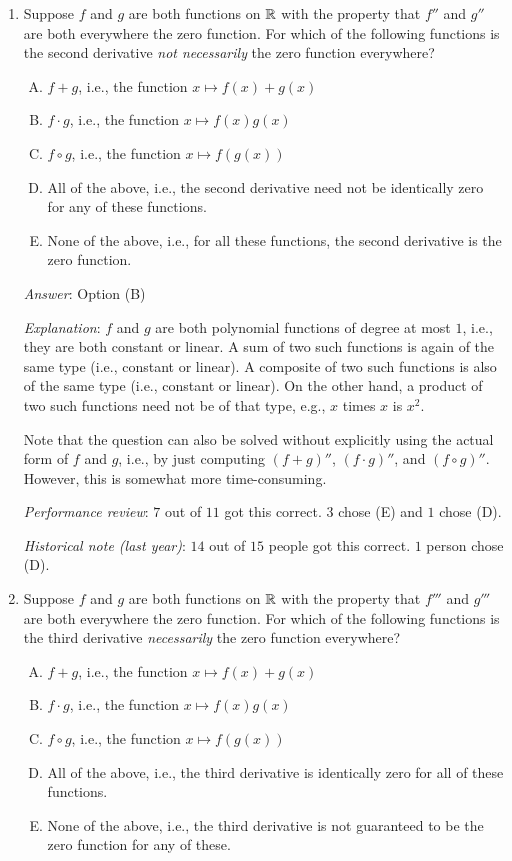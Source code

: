 \documentclass[10pt]{amsart}
\begin{document}
\begin{enumerate}

\item Suppose $f$ and $g$ are both functions on $\mathbb{R}$ with the property
  that $f''$ and $g''$ are both everywhere the zero function. For
  which of the following functions is the second derivative {\em not
  necessarily} the zero function everywhere?

  \begin{enumerate}[(A)]
  \item $f + g$, i.e., the function $x \mapsto f(x) + g(x)$
  \item $f \cdot g$, i.e., the function $x \mapsto f(x)g(x)$
  \item $f \circ g$, i.e., the function $x \mapsto f(g(x))$
  \item All of the above, i.e., the second derivative need not be
    identically zero for any of these functions.
  \item None of the above, i.e., for all these functions, the second
    derivative is the zero function.
  \end{enumerate}

  {\em Answer}: Option (B)

  {\em Explanation}: $f$ and $g$ are both polynomial functions of
  degree at most $1$, i.e., they are both constant or linear. A sum of
  two such functions is again of the same type (i.e., constant or
  linear). A composite of two such functions is also of the same type
  (i.e., constant or linear). On the other hand, a product of two such
  functions need not be of that type, e.g., $x$ times $x$ is $x^2$.

  Note that the question can also be solved without explicitly using
  the actual form of $f$ and $g$, i.e., by just computing $(f + g)''$,
  $(f \cdot g)''$, and $(f \circ g)''$. However, this is somewhat more
  time-consuming.

  {\em Performance review}: $7$ out of $11$ got this correct. $3$
  chose (E) and $1$ chose (D).

  {\em Historical note (last year)}: $14$ out of $15$ people got this
  correct. $1$ person chose (D).

\item Suppose $f$ and $g$ are both functions on $\mathbb{R}$ with the property
  that $f'''$ and $g'''$ are both everywhere the zero function. For
  which of the following functions is the third derivative {\em
  necessarily} the zero function everywhere?

  \begin{enumerate}[(A)]
  \item $f + g$, i.e., the function $x \mapsto f(x) + g(x)$
  \item $f \cdot g$, i.e., the function $x \mapsto f(x)g(x)$
  \item $f \circ g$, i.e., the function $x \mapsto f(g(x))$
  \item All of the above, i.e., the third derivative is identically
    zero for all of these functions.
  \item None of the above, i.e., the third derivative is not
    guaranteed to be the zero function for any of these.
  \end{enumerate}


\end{enumerate}
\end{document}
